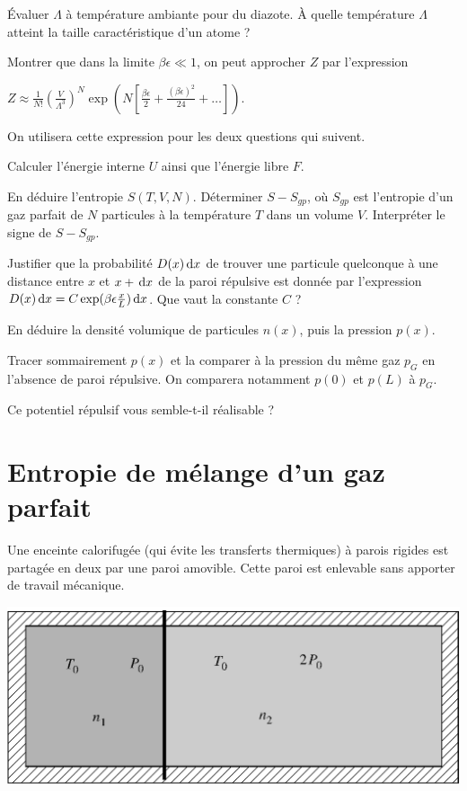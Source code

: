 \documentclass[utf8, 11pt]{feuille}
\begin{document}
\question
\'Evaluer $\Lambda$ à température ambiante pour du diazote. \`A quelle température $\Lambda$ atteint la taille caractéristique d'un atome ?


\question Montrer que dans la limite $\beta \epsilon \ll 1$, on peut approcher $Z$ par l'expression

\begin{center}
    $Z \approx \frac{1}{N!}(\frac{V}{\Lambda^3})^N \exp(N[\frac{\beta \epsilon}{2}+\frac{(\beta \epsilon)^2}{24}+\ldots])$.
\end{center}

On utilisera cette expression pour les deux questions qui suivent.

\question Calculer l’énergie interne $U$ ainsi que l’énergie libre $F$.

\question En déduire l’entropie $S(T,V,N)$. Déterminer $S- S_{gp}$, où $S_{gp}$ est l’entropie d’un gaz parfait de $N$ particules à la température $T$ dans un volume $V$. Interpréter le signe de $S- S_{gp}$.


\question Justifier que la probabilité $D(x) \, \mathrm{d} x$ de trouver une particule quelconque à une distance entre $x$ et $x+\, \mathrm{d} x$ de la paroi répulsive est donnée par l'expression $D(x) \, \mathrm{d} x = C\exp( \beta \epsilon \frac{x}{L}) \, \mathrm{d} x$. Que vaut la constante $C$ ?

\question En déduire la densité volumique de particules $n(x)$, puis la pression $p(x)$.

\question Tracer sommairement $p(x)$ et la comparer à la pression du même gaz $p_G$ en l'absence de paroi répulsive. On comparera notamment $p(0)$ et $p(L)$ à $p_G$.

\question Ce potentiel répulsif vous semble-t-il réalisable ? 



\section{Entropie de mélange d'un gaz parfait}


Une enceinte calorifugée (qui évite les transferts thermiques) à parois rigides est partagée en deux par une paroi amovible. Cette paroi est enlevable sans apporter de travail mécanique.

\begin{center}
\includegraphics[scale=0.8]{detente_isolee_sur_reseau}
\end{center}
\end{document}
